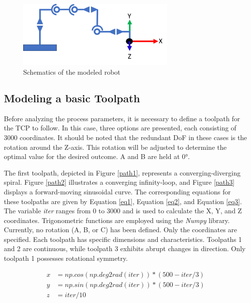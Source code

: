 \begin{figure}[H]
	\centerline{\includegraphics[width=0.7\textwidth]{figures/schema.png}}
	\caption{Schematics of the modeled robot}
	\label{schema}
\end{figure}

\subsection{Modeling a basic Toolpath}\label{MBT}
Before analyzing the process parameters, it is necessary to define a toolpath for the \acrshort{TCP} to follow. In this case, three options are presented, each consisting of 3000 coordinates. It should be noted that the redundant \acrshort{DoF} in these cases is the rotation around the Z-axis. This rotation will be adjusted to determine the optimal value for the desired outcome. A and B are held at 0°.

The first toolpath, depicted in Figure \ref{path1}, represents a converging-diverging spiral. Figure \ref{path2} illustrates a converging infinity-loop, and Figure \ref{path3} displays a forward-moving sinusoidal curve. The corresponding equations for these toolpaths are given by Equation \ref{eq1}, Equation \ref{eq2}, and Equation \ref{eq3}. The variable \textit{iter} ranges from 0 to 3000 and is used to calculate the X, Y, and Z coordinates. Trigonometric functions are employed using the \textit{Numpy} library. Currently, no rotation (A, B, or C) has been defined. Only the coordinates are specified. Each toolpath has specific dimensions and characteristics. Toolpaths 1 and 2 are continuous, while toolpath 3 exhibits abrupt changes in direction. Only toolpath 1 possesses rotational symmetry.

\begin{equation}\label{eq1}
\begin{split}
x &= np.cos(np.deg2rad(iter)) * (500 - iter / 3)\\
y &= np.sin(np.deg2rad(iter)) * (500 - iter / 3)\\
z &= iter / 10
\end{split}
\end{equation}


